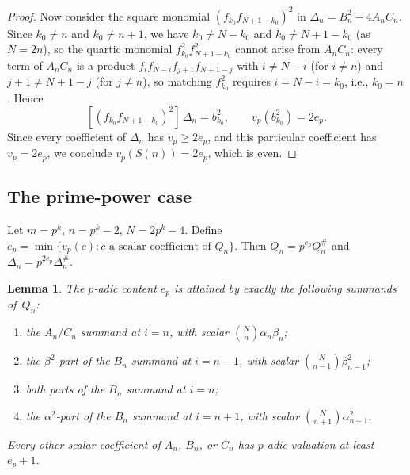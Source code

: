 \documentclass[10pt]{amsart}
\newtheorem{lemma}[theorem]{Lemma}
\theoremstyle{definition}
\theoremstyle{remark}
\begin{document}
\begin{proof}
Now consider the square monomial $(f_{k_0}f_{N+1-k_0})^2$ in
$\Delta_n = B_n^2 - 4A_nC_n$.
Since $k_0 \ne n$ and $k_0 \ne n+1$, we have $k_0 \ne N-k_0$
and $k_0 \ne N+1-k_0$ (as $N = 2n$), so the quartic monomial
$f_{k_0}^2 f_{N+1-k_0}^2$ cannot arise from $A_nC_n$: every term
of $A_nC_n$ is a product $f_if_{N-i}f_{j+1}f_{N+1-j}$ with $i \ne N-i$
(for $i \ne n$) and $j+1 \ne N+1-j$ (for $j \ne n$), so matching
$f_{k_0}^2$ requires $i = N-i = k_0$, i.e., $k_0 = n$.  Hence
\[
[(f_{k_0}f_{N+1-k_0})^2]\,\Delta_n = b_{k_0}^2,
\qquad
v_p(b_{k_0}^2) = 2e_p.
\]
Since every coefficient of $\Delta_n$ has $v_p \ge 2e_p$, and this
particular coefficient has $v_p = 2e_p$, we conclude $v_p(S(n)) = 2e_p$,
which is even.
\end{proof}

\subsection{The prime-power case}\label{subsec:pp}

Let $m=p^k$, $n=p^k-2$, $N=2p^k-4$.  Define
$e_p = \min\{v_p(c) : c \text{ a scalar coefficient of } Q_n\}$.
Then $Q_n = p^{e_p}Q_n^{\#}$ and $\Delta_n = p^{2e_p}\Delta_n^{\#}$.

\begin{lemma}\label{lem:central}
The $p$-adic content $e_p$ is attained by exactly the following
summands of~$Q_n$:
\begin{enumerate}[label=\textup{(\roman*)}]
\item the $A_n/C_n$ summand at $i = n$, with scalar $\binom{N}{n}\alpha_n\beta_n$;
\item the $\beta^2$-part of the $B_n$ summand at $i = n-1$, with scalar
$\binom{N}{n-1}\beta_{n-1}^2$;
\item both parts of the $B_n$ summand at $i = n$;
\item the $\alpha^2$-part of the $B_n$ summand at $i = n+1$, with scalar
$\binom{N}{n+1}\alpha_{n+1}^2$.
\end{enumerate}
Every other scalar coefficient of $A_n$, $B_n$, or $C_n$ has
$p$-adic valuation at least $e_p + 1$.
\end{lemma}
\end{document}
